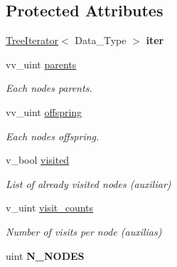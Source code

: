\subsection*{Protected Attributes}
\begin{DoxyCompactItemize}
\item 
\mbox{\label{classTree_a48321c5832c91ca0f0540f044b2408f3}} 
\hyperlink{classTreeIterator}{Tree\+Iterator}$<$ Data\+\_\+\+Type $>$ {\bfseries iter}
\item 
\mbox{\label{classTree_a8a12753341be73b360786b89853dabef}} 
vv\+\_\+uint \hyperlink{classTree_a8a12753341be73b360786b89853dabef}{parents}
\begin{DoxyCompactList}\small\item\em Each nodes\textquotesingle{} parents. \end{DoxyCompactList}\item 
\mbox{\label{classTree_aa63d4b2e2e3833ab5dd8be81fd172015}} 
vv\+\_\+uint \hyperlink{classTree_aa63d4b2e2e3833ab5dd8be81fd172015}{offspring}
\begin{DoxyCompactList}\small\item\em Each nodes\textquotesingle{} offspring. \end{DoxyCompactList}\item 
\mbox{\label{classTree_a2a27e594e67741aec726a6a867b039f1}} 
v\+\_\+bool \hyperlink{classTree_a2a27e594e67741aec726a6a867b039f1}{visited}
\begin{DoxyCompactList}\small\item\em List of already visited nodes (auxiliar) \end{DoxyCompactList}\item 
\mbox{\label{classTree_a6dd407ccaf1c1dd1acb4c170c2ca4fa1}} 
v\+\_\+uint \hyperlink{classTree_a6dd407ccaf1c1dd1acb4c170c2ca4fa1}{visit\+\_\+counts}
\begin{DoxyCompactList}\small\item\em Number of visits per node (auxilias) \end{DoxyCompactList}\item 
\mbox{\label{classTree_a8ebb750fb7bc930b259ec55ee538f07b}} 
uint {\bfseries N\+\_\+\+N\+O\+D\+ES}
\item 

\end{DoxyCompactItemize}
